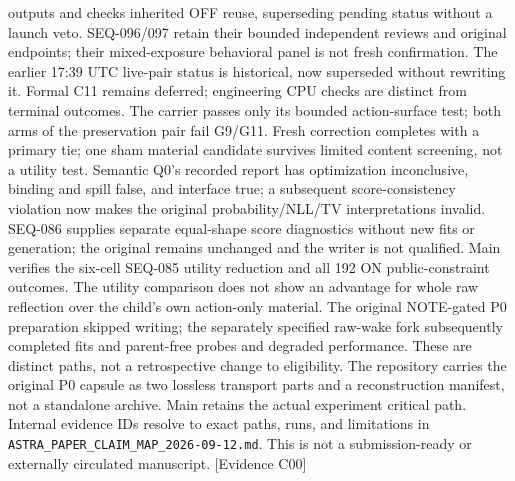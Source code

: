 \documentclass[11pt]{article}
\newcommand{\ev}[1]{\textsf{[Evidence #1]}}
\begin{document}
outputs and checks inherited OFF reuse, superseding pending status without a launch veto.
SEQ-096/097 retain their bounded independent reviews and original endpoints;
their mixed-exposure behavioral panel is not fresh confirmation. The earlier
17:39 UTC live-pair status is historical, now superseded without rewriting it.
Formal C11 remains deferred; engineering CPU checks are distinct from terminal outcomes.
The carrier passes only its bounded action-surface test; both arms of the
preservation pair fail G9/G11. Fresh correction completes with a primary tie;
one sham material candidate survives limited content screening, not a utility
test. Semantic Q0's recorded report has optimization inconclusive, binding and
spill false, and interface true; a subsequent score-consistency violation now
makes the original probability/NLL/TV interpretations invalid. SEQ-086 supplies
separate equal-shape score diagnostics without new fits or generation; the
original remains unchanged and the writer is not qualified. Main verifies the
six-cell SEQ-085 utility reduction and all 192 ON public-constraint outcomes.
The utility comparison does not show an
advantage for whole raw reflection over the child's own action-only material.
The original NOTE-gated P0 preparation skipped
writing; the separately specified raw-wake fork subsequently completed fits
and parent-free probes and degraded performance. These are distinct paths,
not a retrospective change to eligibility. The repository carries the original
P0 capsule as two lossless
transport parts and a reconstruction manifest, not a standalone archive.
Main retains the actual experiment critical path. Internal evidence IDs resolve
to exact paths, runs, and limitations
in \texttt{ASTRA\_PAPER\_CLAIM\_MAP\_2026-09-12.md}. This is not a submission-ready
or externally circulated manuscript. \ev{C00}
\end{document}
